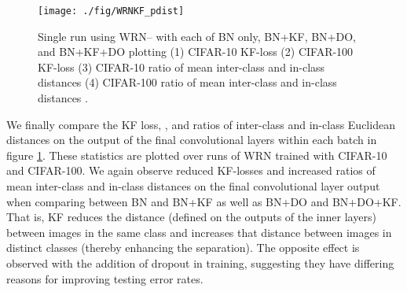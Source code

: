 \documentclass[11pt]{article}
\begin{document}
\begin{figure}[h]
	\begin{center}
			\texttt{[image: ./fig/WRNKF\_pdist]}
		\caption{Single run using WRN-- with each of BN only, BN+KF, BN+DO, and BN+KF+DO plotting (1) CIFAR-10 KF-loss (2) CIFAR-100 KF-loss (3) CIFAR-10 ratio of mean inter-class and in-class distances  (4) CIFAR-100 ratio of mean inter-class and in-class distances .}\label{WRNKF_lossratio}
	\end{center}
\end{figure}

We finally compare the KF loss, , and ratios of inter-class and in-class Euclidean distances on the output of the final convolutional layers within each batch in figure \ref{WRNKF_lossratio}.  These statistics are plotted over runs of WRN trained with CIFAR-10 and CIFAR-100.  We again observe reduced KF-losses and increased ratios of mean inter-class and in-class distances on the final convolutional layer output  when comparing between BN and BN+KF as well as BN+DO and BN+DO+KF.  That is, KF reduces the distance (defined on the outputs of the inner layers) between images in the same class and increases that distance between images in distinct classes (thereby enhancing the separation).  The opposite effect is observed with the addition of dropout in training, suggesting they have differing reasons for improving testing error rates.


\begin{comment}
\section{Concluding remarks}

A framework for the application of kernel flows to Convolutional Neural Networks has been introduced which adds a generalizeability inspired loss function on hidden layer outputs.  This is optimized in tandem with the accuracy of the final output layer's accuracy.  We have presented a couple practical methods for its application to the MNIST database which has been shown to improve testing errors without decreasing training error as in dropout.  Further work could include research into richer kernel families possibly incorporating all hidden layer outputs.
\end{comment}
\end{document}
